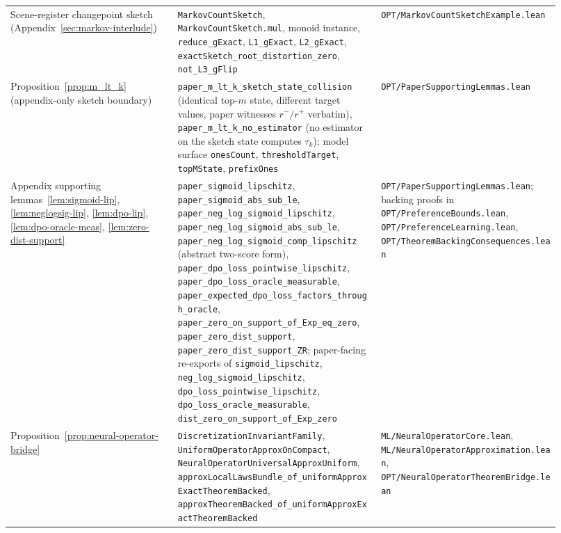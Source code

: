 {\begin{longtable}{p{0.28\linewidth}p{0.34\linewidth}p{0.30\linewidth}}
Scene-register changepoint sketch (Appendix~\ref{sec:markov-interlude}) &
\texttt{MarkovCountSketch}, \texttt{MarkovCountSketch.mul}, monoid instance,
\texttt{reduce\_gExact}, \texttt{L1\_gExact}, \texttt{L2\_gExact},
\texttt{exactSketch\_root\_distortion\_zero}, \texttt{not\_L3\_gFlip} &
\texttt{OPT/MarkovCountSketchExample.lean} \\

Proposition~\ref{prop:m_lt_k} (appendix-only sketch boundary) &
\texttt{paper\_m\_lt\_k\_sketch\_state\_collision} (identical top-$m$ state,
different target values, paper witnesses $r^{-}/r^{+}$ verbatim),
\texttt{paper\_m\_lt\_k\_no\_estimator} (no estimator on the sketch state
computes $\tau_k$); model surface \texttt{onesCount},
\texttt{thresholdTarget}, \texttt{topMState}, \texttt{prefixOnes} &
\texttt{OPT/PaperSupportingLemmas.lean} \\

Appendix supporting lemmas~\ref{lem:sigmoid-lip}, \ref{lem:neglogsig-lip},
\ref{lem:dpo-lip}, \ref{lem:dpo-oracle-meas}, \ref{lem:zero-dist-support} &
\texttt{paper\_sigmoid\_lipschitz}, \texttt{paper\_sigmoid\_abs\_sub\_le},
\texttt{paper\_neg\_log\_sigmoid\_lipschitz},
\texttt{paper\_neg\_log\_sigmoid\_abs\_sub\_le},
\texttt{paper\_neg\_log\_sigmoid\_comp\_lipschitz} (abstract two-score form),
\texttt{paper\_dpo\_loss\_pointwise\_lipschitz},
\texttt{paper\_dpo\_loss\_oracle\_measurable},
\nolinkurl{paper_expected_dpo_loss_factors_through_oracle},
\nolinkurl{paper_zero_on_support_of_Exp_eq_zero},
\texttt{paper\_zero\_dist\_support}, \texttt{paper\_zero\_dist\_support\_ZR};
paper-facing re-exports of \texttt{sigmoid\_lipschitz},
\texttt{neg\_log\_sigmoid\_lipschitz}, \texttt{dpo\_loss\_pointwise\_lipschitz},
\texttt{dpo\_loss\_oracle\_measurable},
\nolinkurl{dist_zero_on_support_of_Exp_zero} &
\texttt{OPT/PaperSupportingLemmas.lean}; backing proofs in
\texttt{OPT/PreferenceBounds.lean}, \texttt{OPT/PreferenceLearning.lean},
\texttt{OPT/TheoremBackingConsequences.lean} \\

Proposition~\ref{prop:neural-operator-bridge} &
\texttt{DiscretizationInvariantFamily}, \texttt{UniformOperatorApproxOnCompact}, \texttt{NeuralOperatorUniversalApproxUniform}, \texttt{approxLocalLawsBundle\_of\_uniformApproxExactTheoremBacked}, \texttt{approxTheoremBacked\_of\_uniformApproxExactTheoremBacked} &
\texttt{ML/NeuralOperatorCore.lean}, \texttt{ML/NeuralOperatorApproximation.lean}, \texttt{OPT/NeuralOperatorTheoremBridge.lean} \\


\end{longtable}}
